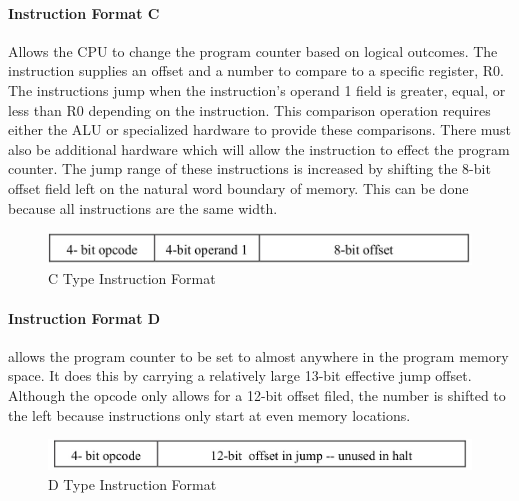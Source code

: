         \paragraph*{Instruction Format C}
        Allows the CPU to change the program counter based on logical outcomes. The instruction supplies an offset and
        a number to compare to a specific register, R0. The instructions jump when the instruction's operand 1 field is
        greater, equal, or less than R0 depending on the instruction. This comparison operation requires either the ALU
        or specialized hardware to provide these comparisons. There must also be additional hardware which will allow the 
        instruction to effect the program counter. The jump range of these instructions is increased by shifting the 8-bit
        offset field left on the natural word boundary of memory. This can be done because all instructions are the  same
        width.
        \begin{figure}[htpb]
            \includegraphics[width=.48\textwidth]{./figures/ctype.jpg}
            \caption{C Type Instruction Format}
        \end{figure}

        \paragraph*{Instruction Format D}
        allows the program counter to be set to almost anywhere in the program memory space. It does this by carrying a
        relatively large 13-bit effective jump offset. Although the opcode only allows for a 12-bit offset filed, the
        number is shifted to the left because instructions only start at even memory locations.

        \begin{figure}[htpb]
            \includegraphics[width=.48\textwidth]{./figures/dtype.jpg}
            \caption{D Type Instruction Format}
        \end{figure}

